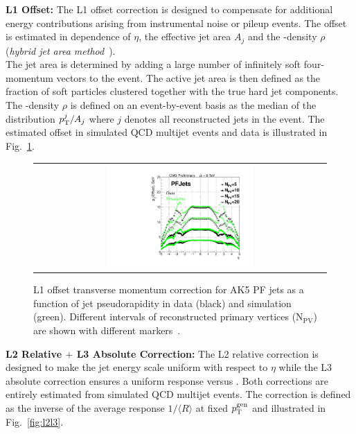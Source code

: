 \begin{description}
 \item \textbf{L1 Offset:} The L1 offset correction is designed to compensate for additional energy contributions arising from instrumental noise or pileup events. The \pt offset is estimated in dependence of $\eta$, the effective jet area $A_j$ and the \pt-density $\rho$ (\textit{hybrid jet area method}~\cite{Cacciari2008119}). \\
The jet area is determined by adding a large number of infinitely soft four-momentum vectors to the event. The active jet area is then defined as the fraction of soft particles clustered together with the true hard jet components. The \pt-density $\rho$ is defined on an event-by-event basis as the median of the distribution $p_{\text{T}}^{j}/A_{j}$ where $j$ denotes all reconstructed jets in the event. The estimated offset in simulated QCD multijet events and data is illustrated in Fig.~\ref{fig:l1offset}.
\begin{figure}[!h]
  \centering 
  \begin{tabular}{c}
    \includegraphics[width=0.51\textwidth]{figures/OffsetVsEta_NPV_PF5_data53_vs_mc53.pdf} 
  \end{tabular}
  \caption{L1 offset transverse momentum correction for AK5 PF jets as a function of jet pseudorapidity in data (black) and simulation (green). Different intervals of reconstructed primary vertices ($\mathrm{N_{PV}}$) are shown with different markers~\cite{CMS-DP-2013-033}.}
  \label{fig:l1offset}
\end{figure}
 \item \textbf{L2 Relative $+$ L3 Absolute Correction:} The L2 relative correction is designed to make the jet energy scale uniform with respect to $\eta$ while the L3 absolute correction ensures a uniform response versus \pt. Both corrections are entirely estimated from simulated QCD multijet events. The correction is defined as the inverse of the average response $1/\langle R \rangle$ at fixed $p_{\text{T}}^\mathrm{gen}$ and illustrated in Fig.~\ref{fig:l2l3}.
\begin{figure}[!h]

\end{figure}
\end{description}
